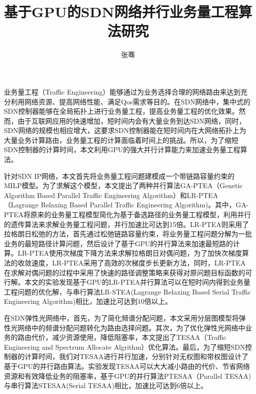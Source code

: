 \documentclass[master]{thesis-uestc}
\title{基于GPU的SDN网络并行业务量工程算法研究}
\author{张骞}
\begin{document}
\begin{chineseabstract}
业务量工程（Traffic Engineering）能够通过为业务选择合理的网络路由来达到充分利用网络资源、提高网络性能、满足Qos需求等目的。在SDN网络中，集中式的SDN控制器能够在全局拓扑上进行业务量工程，提高业务量工程的优化效果。然而，由于互联网应用的快速增加，短时间内会有大量业务到达SDN网络，同时，SDN网络的规模也相应增大，这要求SDN控制器能在短时间内在大网络拓扑上为大量业务计算路由，业务量工程的计算面临着时间上的挑战。所以，为了缩短SDN控制器的计算时间，本文利用GPU的强大并行计算能力来加速业务量工程算法。

针对SDN IP网络，本文首先将业务量工程问题建模成一个带链路容量约束的MILP模型。为了求解这个模型，本文提出了两种并行算法GA-PTEA（Genetic Algorithm Based Parallel Traffic Engineering Algorithm）和LR-PTEA（Lagrange Relaxing Based Parallel Traffic Engineering Algorithm)。其中，GA-PTEA将原来的业务量工程模型简化为基于备选路径的业务量工程模型，利用并行的遗传算法来求解业务量工程问题，并行加速比可达到15倍。LR-PTEA则采用了拉格朗日松弛的方法，首先通过松弛链路容量约束，将业务量工程问题分解为一批业务的最短路径计算问题，然后设计了基于GPU的并行算法来加速最短路的计算。LR-PTEA使用次梯度下降方法来求解拉格朗日对偶问题，为了加快次梯度算法的收敛速度，LR-PTEA采用了高效的次梯度步长更新方法，同时，LR-PTEA在求解对偶问题的过程中采用了快速的路径调整策略来获得对原问题目标函数的可行解。本文的实验发现基于GPU的LR-PTEA并行算法可以在短时间内得到业务量工程问题的优化解，与串行算法LR-STEA(Lagrange Relaxing Based Serial Traffic Engineering Algorithm)相比，加速比可达到10倍以上。

在SDN弹性光网络中，首先，为了简化频谱分配问题，本文采用分层图模型将弹性光网络中的频谱分配问题转化为路由选择问题。其次，为了优化弹性光网络中业务的路由代价，减少资源使用，降低阻塞率，本文提出了TESAA（Traffic Engineering and Spectrum Allocate Algrithm）优化算法。最后，为了缩短SDN控制器的计算时间，我们对TESAA进行并行加速，分别针对无权图和带权图设计了基于GPU的并行路由算法。实验发现TESAA可以大大减小路由的代价、节省网络资源和有效降低业务的阻塞率，基于GPU的并行算法PTESAA（Parallel TESAA)与串行算法STESAA(Serial TESAA)相比，加速比可达到6倍以上。

\end{chineseabstract}
\end{document}
